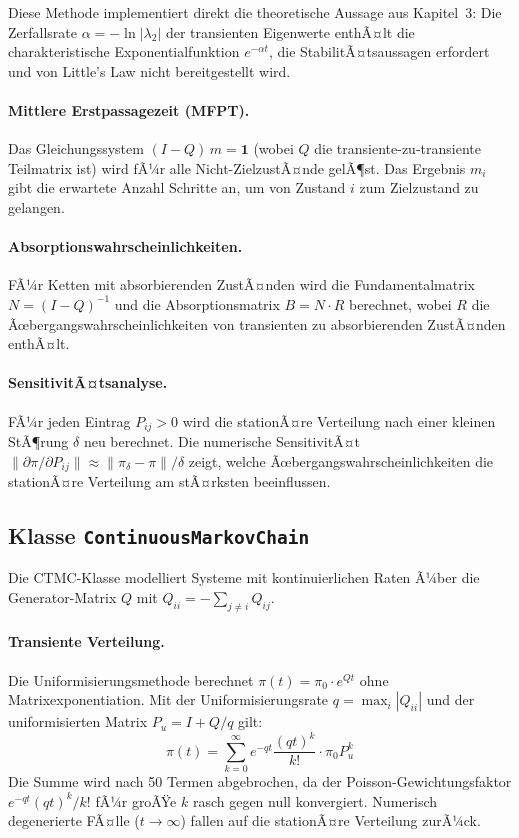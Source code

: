 ﻿\documentclass[a4paper,12pt]{report}
\theoremstyle{definition}
\begin{document}
Diese Methode implementiert direkt die theoretische Aussage aus Kapitel~3:
Die Zerfallsrate $\alpha = -\ln|\lambda_2|$ der transienten Eigenwerte
enthÃ¤lt die charakteristische Exponentialfunktion $e^{-\alpha t}$, die
StabilitÃ¤tsaussagen erfordert und von Little's Law nicht bereitgestellt wird.

\paragraph{Mittlere Erstpassagezeit (MFPT).}
Das Gleichungssystem $(I - Q)\,m = \mathbf{1}$ (wobei $Q$ die
transiente-zu-transiente Teilmatrix ist) wird fÃ¼r alle Nicht-ZielzustÃ¤nde
gelÃ¶st. Das Ergebnis $m_i$ gibt die erwartete Anzahl Schritte an, um von
Zustand $i$ zum Zielzustand zu gelangen.

\paragraph{Absorptionswahrscheinlichkeiten.}
FÃ¼r Ketten mit absorbierenden ZustÃ¤nden wird die Fundamentalmatrix
$N = (I-Q)^{-1}$ und die Absorptionsmatrix $B = N \cdot R$ berechnet,
wobei $R$ die Ãœbergangswahrscheinlichkeiten von transienten zu
absorbierenden ZustÃ¤nden enthÃ¤lt.

\paragraph{SensitivitÃ¤tsanalyse.}
FÃ¼r jeden Eintrag $P_{ij} > 0$ wird die stationÃ¤re Verteilung nach einer
kleinen StÃ¶rung $\delta$ neu berechnet. Die numerische SensitivitÃ¤t
$\|\partial\pi / \partial P_{ij}\| \approx \|\pi_{\delta} - \pi\| / \delta$
zeigt, welche Ãœbergangswahrscheinlichkeiten die stationÃ¤re Verteilung
am stÃ¤rksten beeinflussen.

\subsection{Klasse \texttt{ContinuousMarkovChain}}

Die CTMC-Klasse modelliert Systeme mit kontinuierlichen Raten Ã¼ber die
Generator-Matrix $Q$ mit $Q_{ii} = -\sum_{j \neq i} Q_{ij}$.

\paragraph{Transiente Verteilung.}
Die Uniformisierungsmethode berechnet $\pi(t) = \pi_0 \cdot e^{Qt}$
ohne Matrixexponentiation. Mit der Uniformisierungsrate $q = \max_i |Q_{ii}|$
und der uniformisierten Matrix $P_u = I + Q/q$ gilt:
\begin{equation}
	\pi(t) = \sum_{k=0}^{\infty} e^{-qt} \frac{(qt)^k}{k!} \cdot \pi_0 P_u^k
\end{equation}
Die Summe wird nach 50 Termen abgebrochen, da der Poisson-Gewichtungsfaktor
$e^{-qt}(qt)^k/k!$ fÃ¼r groÃŸe $k$ rasch gegen null konvergiert. Numerisch
degenerierte FÃ¤lle ($t \to \infty$) fallen auf die stationÃ¤re Verteilung zurÃ¼ck.
\end{document}
